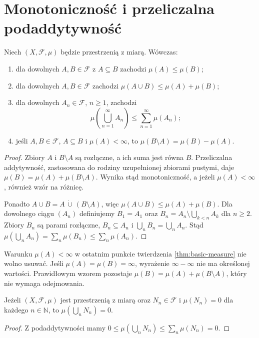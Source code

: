 \section{Monotoniczność i przeliczalna podaddytywność}

\begin{twierdzenie}
\label{thm:basic-measure}
Niech $(X,\mathcal F,\mu)$ będzie przestrzenią z miarą.
Wówczas:
\begin{enumerate}
\item dla dowolnych $A,B\in\mathcal F$ z $A\subseteq B$ zachodzi
$\mu(A)\leq\mu(B)$;
\item dla dowolnych $A,B\in\mathcal F$ zachodzi
$\mu(A\cup B)\leq\mu(A)+\mu(B)$;
\item dla dowolnych $A_n\in\mathcal F$, $n\geq1$, zachodzi
\begin{equation}
\label{eq:subadditivity}
\mu\left(\bigcup_{n=1}^{\infty}A_n\right)
\leq\sum_{n=1}^{\infty}\mu(A_n);
\end{equation}
\item jeśli $A,B\in\mathcal F$, $A\subseteq B$ i $\mu(A)<\infty$,
to $\mu(B\setminus A)=\mu(B)-\mu(A)$.
\end{enumerate}
\end{twierdzenie}
\begin{proof}
Zbiory $A$ i $B\setminus A$ są rozłączne, a ich suma jest równa $B$.
Przeliczalna addytywność, zastosowana do rodziny uzupełnionej
zbiorami pustymi, daje
$\mu(B)=\mu(A)+\mu(B\setminus A)$. Wynika stąd monotoniczność,
a jeżeli $\mu(A)<\infty$, również wzór na różnicę.

Ponadto $A\cup B=A\,\dot\cup\,(B\setminus A)$, więc
$\mu(A\cup B)\leq\mu(A)+\mu(B)$.
Dla dowolnego ciągu $(A_n)$ definiujemy
$B_1=A_1$ oraz
$B_n=A_n\setminus\bigcup_{k<n}A_k$ dla $n\geq2$.
Zbiory $B_n$ są parami rozłączne, $B_n\subseteq A_n$
i $\bigcup_nB_n=\bigcup_nA_n$. Stąd
$\mu(\bigcup_nA_n)=\sum_n\mu(B_n)\leq\sum_n\mu(A_n)$.
\end{proof}

\begin{uwaga}
Warunku $\mu(A)<\infty$ w ostatnim punkcie twierdzenia
\ref{thm:basic-measure} nie wolno usuwać. Jeśli
$\mu(A)=\mu(B)=\infty$, wyrażenie $\infty-\infty$
nie ma określonej wartości. Prawidłowym wzorem pozostaje
$\mu(B)=\mu(A)+\mu(B\setminus A)$, który nie wymaga odejmowania.
\end{uwaga}

\begin{wniosek}
\label{cor:null-union}
Jeżeli $(X,\mathcal F,\mu)$ jest przestrzenią z miarą oraz
$N_n\in\mathcal F$ i $\mu(N_n)=0$ dla każdego $n\in\mathbb N$,
to $\mu(\bigcup_nN_n)=0$.
\end{wniosek}
\begin{proof}
Z podaddytywności mamy
$0\leq\mu(\bigcup_nN_n)\leq\sum_n\mu(N_n)=0$.
\end{proof}

